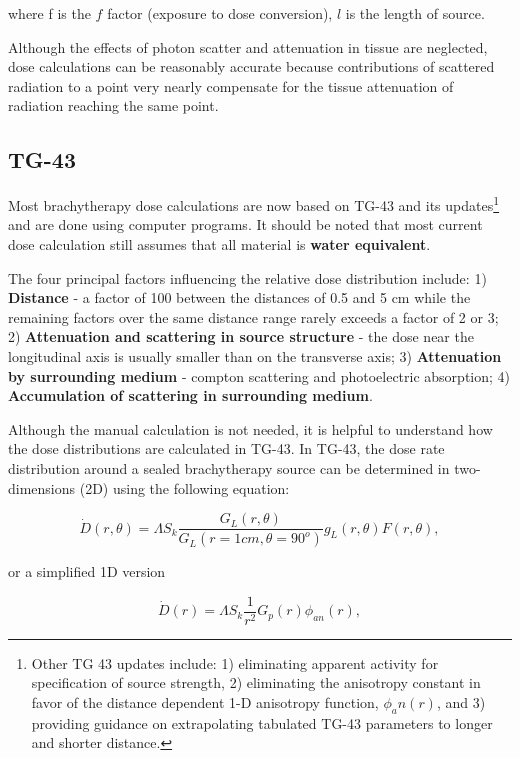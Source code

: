 \documentclass[]{book}
\let\rmarkdownfootnote\footnote%
\def\footnote{\protect\rmarkdownfootnote}
\theoremstyle{definition}
\theoremstyle{definition}
\theoremstyle{definition}
\theoremstyle{remark}
\begin{document}
where f is the \(f\) factor (exposure to dose conversion), \(l\) is the
length of source.

Although the effects of photon scatter and attenuation in tissue are
neglected, dose calculations can be reasonably accurate because
contributions of scattered radiation to a point very nearly compensate
for the tissue attenuation of radiation reaching the same point.

\subsection{TG-43}\label{tg43}

Most brachytherapy dose calculations are now based on TG-43 and its
updates\footnote{Other TG 43 updates include: 1) eliminating apparent
  activity for specification of source strength, 2) eliminating the
  anisotropy constant in favor of the distance dependent 1-D anisotropy
  function, \(\phi_an(r)\), and 3) providing guidance on extrapolating
  tabulated TG-43 parameters to longer and shorter distance.} and are
done using computer programs. It should be noted that most current dose
calculation still assumes that all material is \textbf{water
equivalent}.

The four principal factors influencing the relative dose distribution
include: 1) \textbf{Distance} - a factor of 100 between the distances of
0.5 and 5 cm while the remaining factors over the same distance range
rarely exceeds a factor of 2 or 3; 2) \textbf{Attenuation and scattering
in source structure} - the dose near the longitudinal axis is usually
smaller than on the transverse axis; 3) \textbf{Attenuation by
surrounding medium} - compton scattering and photoelectric absorption;
4) \textbf{Accumulation of scattering in surrounding medium}.

Although the manual calculation is not needed, it is helpful to
understand how the dose distributions are calculated in TG-43. In TG-43,
the dose rate distribution around a sealed brachytherapy source can be
determined in two-dimensions (2D) using the following equation:

\begin{equation}
   \dot D(r, \theta) = \Lambda S_k \frac{G_L(r, \theta)}{G_L(r=1cm,\theta=90^o)} g_L(r, \theta) F(r,\theta),
   \label{eq:tg43}
\end{equation}

or a simplified 1D version

\begin{equation}
   \dot D(r) = \Lambda S_k \frac{1}{r^2} G_p(r)\phi_{an}(r),
   \label{eq:tg43-1D}
\end{equation}
\end{document}
